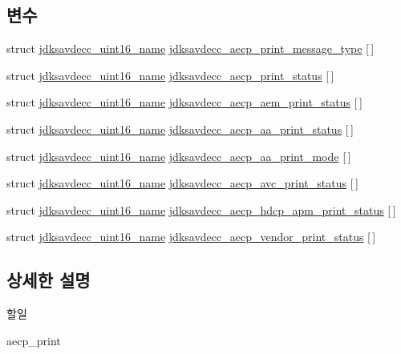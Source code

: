 \subsection*{변수}
\begin{DoxyCompactItemize}
\item 
struct \hyperlink{structjdksavdecc__uint16__name}{jdksavdecc\+\_\+uint16\+\_\+name} \hyperlink{group__aecp__print_gafc0c0a93f044f415ebcc499d3d7119a5}{jdksavdecc\+\_\+aecp\+\_\+print\+\_\+message\+\_\+type} \mbox{[}$\,$\mbox{]}
\item 
struct \hyperlink{structjdksavdecc__uint16__name}{jdksavdecc\+\_\+uint16\+\_\+name} \hyperlink{group__aecp__print_ga3f478fcbbe933768f463bef56b4d98a8}{jdksavdecc\+\_\+aecp\+\_\+print\+\_\+status} \mbox{[}$\,$\mbox{]}
\item 
struct \hyperlink{structjdksavdecc__uint16__name}{jdksavdecc\+\_\+uint16\+\_\+name} \hyperlink{group__aecp__print_gadd819ed386f3ae5573685eb11ff930d9}{jdksavdecc\+\_\+aecp\+\_\+aem\+\_\+print\+\_\+status} \mbox{[}$\,$\mbox{]}
\item 
struct \hyperlink{structjdksavdecc__uint16__name}{jdksavdecc\+\_\+uint16\+\_\+name} \hyperlink{group__aecp__print_ga44190bbd7791bc071cd082a8d791b4d2}{jdksavdecc\+\_\+aecp\+\_\+aa\+\_\+print\+\_\+status} \mbox{[}$\,$\mbox{]}
\item 
struct \hyperlink{structjdksavdecc__uint16__name}{jdksavdecc\+\_\+uint16\+\_\+name} \hyperlink{group__aecp__print_ga2369362280dbb67a80ddca83ce8ef807}{jdksavdecc\+\_\+aecp\+\_\+aa\+\_\+print\+\_\+mode} \mbox{[}$\,$\mbox{]}
\item 
struct \hyperlink{structjdksavdecc__uint16__name}{jdksavdecc\+\_\+uint16\+\_\+name} \hyperlink{group__aecp__print_ga1d0387b1ab44b2bc836c369130ad7d7a}{jdksavdecc\+\_\+aecp\+\_\+avc\+\_\+print\+\_\+status} \mbox{[}$\,$\mbox{]}
\item 
struct \hyperlink{structjdksavdecc__uint16__name}{jdksavdecc\+\_\+uint16\+\_\+name} \hyperlink{group__aecp__print_gabd6228d42e89612d3e6f1753949893e6}{jdksavdecc\+\_\+aecp\+\_\+hdcp\+\_\+apm\+\_\+print\+\_\+status} \mbox{[}$\,$\mbox{]}
\item 
struct \hyperlink{structjdksavdecc__uint16__name}{jdksavdecc\+\_\+uint16\+\_\+name} \hyperlink{group__aecp__print_gaca25183a2710580e271aa36225535463}{jdksavdecc\+\_\+aecp\+\_\+vendor\+\_\+print\+\_\+status} \mbox{[}$\,$\mbox{]}
\end{DoxyCompactItemize}


\subsection{상세한 설명}
\begin{DoxyRefDesc}{할일}
\item[\hyperlink{todo__todo000004}{할일}]aecp\+\_\+print \end{DoxyRefDesc}


